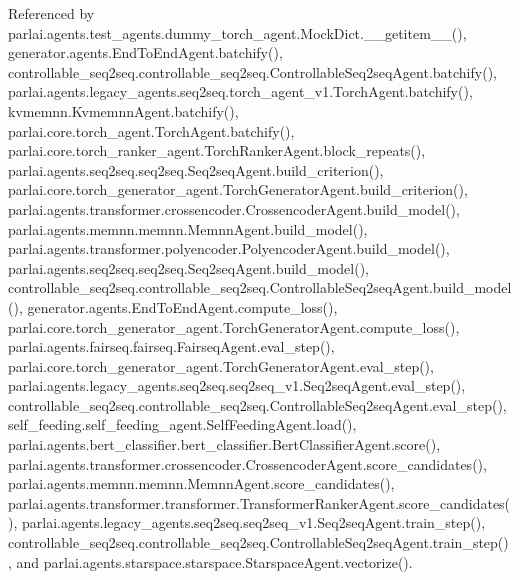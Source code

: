 Referenced by parlai.\+agents.\+test\+\_\+agents.\+dummy\+\_\+torch\+\_\+agent.\+Mock\+Dict.\+\_\+\+\_\+getitem\+\_\+\+\_\+(), generator.\+agents.\+End\+To\+End\+Agent.\+batchify(), controllable\+\_\+seq2seq.\+controllable\+\_\+seq2seq.\+Controllable\+Seq2seq\+Agent.\+batchify(), parlai.\+agents.\+legacy\+\_\+agents.\+seq2seq.\+torch\+\_\+agent\+\_\+v1.\+Torch\+Agent.\+batchify(), kvmemnn.\+Kvmemnn\+Agent.\+batchify(), parlai.\+core.\+torch\+\_\+agent.\+Torch\+Agent.\+batchify(), parlai.\+core.\+torch\+\_\+ranker\+\_\+agent.\+Torch\+Ranker\+Agent.\+block\+\_\+repeats(), parlai.\+agents.\+seq2seq.\+seq2seq.\+Seq2seq\+Agent.\+build\+\_\+criterion(), parlai.\+core.\+torch\+\_\+generator\+\_\+agent.\+Torch\+Generator\+Agent.\+build\+\_\+criterion(), parlai.\+agents.\+transformer.\+crossencoder.\+Crossencoder\+Agent.\+build\+\_\+model(), parlai.\+agents.\+memnn.\+memnn.\+Memnn\+Agent.\+build\+\_\+model(), parlai.\+agents.\+transformer.\+polyencoder.\+Polyencoder\+Agent.\+build\+\_\+model(), parlai.\+agents.\+seq2seq.\+seq2seq.\+Seq2seq\+Agent.\+build\+\_\+model(), controllable\+\_\+seq2seq.\+controllable\+\_\+seq2seq.\+Controllable\+Seq2seq\+Agent.\+build\+\_\+model(), generator.\+agents.\+End\+To\+End\+Agent.\+compute\+\_\+loss(), parlai.\+core.\+torch\+\_\+generator\+\_\+agent.\+Torch\+Generator\+Agent.\+compute\+\_\+loss(), parlai.\+agents.\+fairseq.\+fairseq.\+Fairseq\+Agent.\+eval\+\_\+step(), parlai.\+core.\+torch\+\_\+generator\+\_\+agent.\+Torch\+Generator\+Agent.\+eval\+\_\+step(), parlai.\+agents.\+legacy\+\_\+agents.\+seq2seq.\+seq2seq\+\_\+v1.\+Seq2seq\+Agent.\+eval\+\_\+step(), controllable\+\_\+seq2seq.\+controllable\+\_\+seq2seq.\+Controllable\+Seq2seq\+Agent.\+eval\+\_\+step(), self\+\_\+feeding.\+self\+\_\+feeding\+\_\+agent.\+Self\+Feeding\+Agent.\+load(), parlai.\+agents.\+bert\+\_\+classifier.\+bert\+\_\+classifier.\+Bert\+Classifier\+Agent.\+score(), parlai.\+agents.\+transformer.\+crossencoder.\+Crossencoder\+Agent.\+score\+\_\+candidates(), parlai.\+agents.\+memnn.\+memnn.\+Memnn\+Agent.\+score\+\_\+candidates(), parlai.\+agents.\+transformer.\+transformer.\+Transformer\+Ranker\+Agent.\+score\+\_\+candidates(), parlai.\+agents.\+legacy\+\_\+agents.\+seq2seq.\+seq2seq\+\_\+v1.\+Seq2seq\+Agent.\+train\+\_\+step(), controllable\+\_\+seq2seq.\+controllable\+\_\+seq2seq.\+Controllable\+Seq2seq\+Agent.\+train\+\_\+step(), and parlai.\+agents.\+starspace.\+starspace.\+Starspace\+Agent.\+vectorize().

\mbox{\label{classparlai_1_1agents_1_1legacy__agents_1_1seq2seq_1_1torch__agent__v1_1_1TorchAgent_a04fa334c086cf9afa815a44f1948e625}} 
